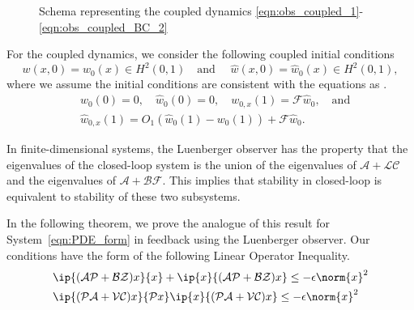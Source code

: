 \documentclass[9pt,journal,twocolumn]{IEEEtran}
\newcommand{\wh}{\hat{w}}
\begin{document}
\begin{figure}[h!]
\caption{Schema representing the coupled dynamics \eqref{eqn:obs_coupled_1}-\eqref{eqn:obs_coupled_BC_2}}
\label{fig:schema}
\end{figure}


For the coupled dynamics, we consider the following coupled initial conditions
\begin{equation}
w(x,0)=w_0(x) \in H^2(0,1)\quad \text{and }\quad \hat w(x,0)=\wh_0(x) \in H^2(0,1),\label{eqn:obs_init_1}
\end{equation}
where we assume the initial conditions are consistent with the equations as .
\begin{align}
&w_0(0)=0, \quad \wh_0(0)=0, \quad w_{0,x}(1)=\mathcal{F}\wh_0, \quad \text{and} \nonumber \\
&\label{eqn:obs_init_2} \wh_{0,x}(1)=O_1(\wh_0(1)-w_0(1))+\mathcal{F}\wh_0.
\end{align}

In finite-dimensional systems, the Luenberger observer has the property that the eigenvalues of the closed-loop system is the union of the eigenvalues of $\mathcal{A}+\mathcal{LC}$ and the eigenvalues of $\mathcal{A}+\mathcal{BF}$. This implies that stability in closed-loop is equivalent to stability of these two subsystems.

In the following theorem, we prove the analogue of this result for System~\eqref{eqn:PDE_form} in feedback using the Luenberger observer. Our conditions have the form of the following Linear Operator Inequality.
\begin{align}
&\ip{(\mathcal{A}\mathcal{P}+\mathcal{B}\mathcal{Z}) x}{x}+\ip{x}{(\mathcal{A}\mathcal{P}+\mathcal{B}\mathcal{Z}) x} \le -\epsilon \norm{x}^2\\
&\ip{(\mathcal{P}\mathcal{A}+\mathcal{V}\mathcal{C})x}{\mathcal{P}x}\ip{x}{(\mathcal{P}\mathcal{A}+\mathcal{V}\mathcal{C}) x} \le -\epsilon \norm{x}^2
\end{align}
\end{document}
